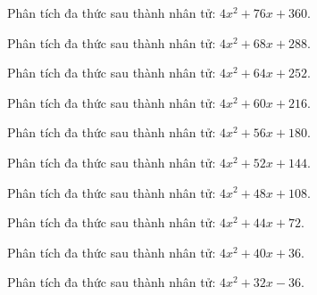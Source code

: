 \begin{bt}
	Phân tích đa thức sau thành nhân tử: $4 x^2 + 76 x + 360$.
\end{bt}
\begin{bt}
	Phân tích đa thức sau thành nhân tử: $4 x^2 + 68 x + 288$.
\end{bt}
\begin{bt}
	Phân tích đa thức sau thành nhân tử: $4 x^2 + 64 x + 252$.
\end{bt}
\begin{bt}
	Phân tích đa thức sau thành nhân tử: $4 x^2 + 60 x + 216$.
\end{bt}
\begin{bt}
	Phân tích đa thức sau thành nhân tử: $4 x^2 + 56 x + 180$.
\end{bt}
\begin{bt}
	Phân tích đa thức sau thành nhân tử: $4 x^2 + 52 x + 144$.
\end{bt}
\begin{bt}
	Phân tích đa thức sau thành nhân tử: $4 x^2 + 48 x + 108$.
\end{bt}
\begin{bt}
	Phân tích đa thức sau thành nhân tử: $4 x^2 + 44 x + 72$.
\end{bt}
\begin{bt}
	Phân tích đa thức sau thành nhân tử: $4 x^2 + 40 x + 36$.
\end{bt}
\begin{bt}
	Phân tích đa thức sau thành nhân tử: $4 x^2 + 32 x - 36$.
\end{bt}

